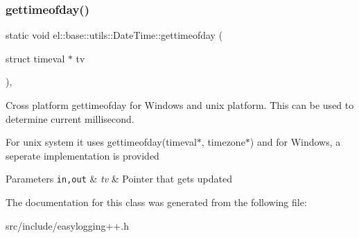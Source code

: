 \subsubsection{\texorpdfstring{gettimeofday()}{gettimeofday()}}
{\footnotesize\ttfamily static void el\+::base\+::utils\+::\+Date\+Time\+::gettimeofday (\begin{DoxyParamCaption}\item[{struct timeval $\ast$}]{tv }\end{DoxyParamCaption})\hspace{0.3cm}{\ttfamily [inline]}, {\ttfamily [static]}}



Cross platform gettimeofday for Windows and unix platform. This can be used to determine current millisecond. 

For unix system it uses gettimeofday(timeval$\ast$, timezone$\ast$) and for Windows, a seperate implementation is provided 
\begin{DoxyParams}[1]{Parameters}
\mbox{\tt in,out}  & {\em tv} & Pointer that gets updated \\
\hline
\end{DoxyParams}


The documentation for this class was generated from the following file\+:\begin{DoxyCompactItemize}
\item 
src/include/easylogging++.\+h\end{DoxyCompactItemize}
